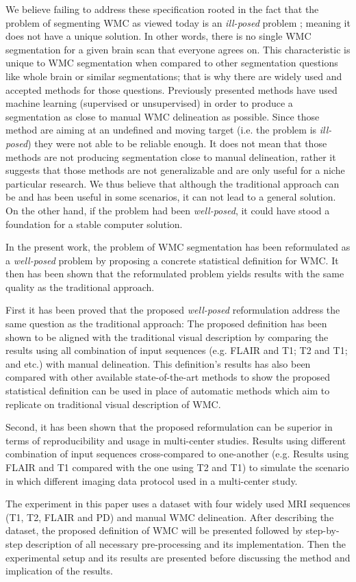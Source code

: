 We believe failing to address these specification rooted in the fact that the problem of segmenting WMC as viewed today is an \textit{ill-posed} problem \cite{IllPosed}; meaning it does not have a unique solution. In other words, there is no single WMC segmentation for a given brain scan that everyone agrees on. This characteristic is unique to WMC segmentation when compared to other segmentation questions like whole brain or similar segmentations; that is why there are widely used and accepted methods for those questions. Previously presented methods have used machine learning (supervised or unsupervised) in order to produce a segmentation as close to manual WMC delineation as possible. Since those method are aiming at an undefined and moving target (i.e. the problem is \textit{ill-posed}) they were not able to be reliable enough. It does not mean that those methods are not producing segmentation close to manual delineation, rather it suggests that those methods are not generalizable and are only useful for a niche particular research. We thus believe that although the traditional approach can be and has been useful in some scenarios, it can not lead to a general solution. On the other hand, if the problem had been \textit{well-posed}, it could have stood a foundation for a stable computer solution.

In the present work, the problem of WMC segmentation has been reformulated as a \textit{well-posed} problem by proposing a concrete statistical definition for WMC. It then has been shown that the reformulated problem yields results with the same quality as the traditional approach.

First it has been proved that the proposed \textit{well-posed} reformulation address the same question as the traditional approach: The proposed definition has been shown to be aligned with the traditional visual description by comparing the results using all combination of input sequences (e.g. FLAIR and T1; T2 and T1; and etc.) with manual delineation. This definition's results has also been compared with other available state-of-the-art methods to show the proposed statistical definition can be used in place of automatic methods which aim to replicate on traditional visual description of WMC.

Second, it has been shown that the proposed reformulation can be superior in terms of reproducibility and usage in multi-center studies. Results using different combination of input sequences cross-compared to one-another (e.g. Results using FLAIR and T1 compared with the one using T2 and T1) to simulate the scenario in which different imaging data protocol used in a multi-center study.

The experiment in this paper uses a dataset with four widely used MRI sequences (T1, T2, FLAIR and PD) and manual WMC delineation. After describing the dataset, the proposed definition of WMC will be presented followed by step-by-step description of all necessary pre-processing and its implementation. Then the experimental setup and its results are presented before discussing the method and implication of the results.

  
  
  
  